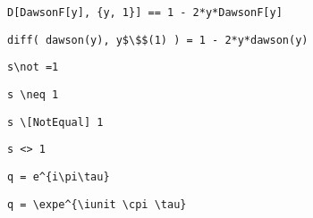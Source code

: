 \newsavebox\AXMM
\begin{lrbox}{\AXMM}
 \begin{minipage}[t]{0.82\textwidth}
  \lstinline[language={[latex]TeX},mathescape,breaklines=true]"D[DawsonF[y], {y, 1}] == 1 - 2*y*DawsonF[y]"
 \end{minipage}
\end{lrbox}
\newsavebox\AXMA
\begin{lrbox}{\AXMA}
 \begin{minipage}[t]{0.82\textwidth}
  \lstinline[language={[latex]TeX},mathescape,breaklines=true]"diff( dawson(y), y$\$$(1) ) = 1 - 2*y*dawson(y)"
 \end{minipage}
\end{lrbox}
\newsavebox\AYT
\begin{lrbox}{\AYT}
 \begin{minipage}[t]{0.82\textwidth}
  \lstinline[language={[latex]TeX},mathescape,breaklines=true]"s\not =1"
 \end{minipage}
\end{lrbox}
\newsavebox\AYST
\begin{lrbox}{\AYST}
 \begin{minipage}[t]{0.82\textwidth}
  \lstinline[language={[latex]TeX},mathescape,breaklines=true]"s \neq 1"
 \end{minipage}
\end{lrbox}
\newsavebox\AYMM
\begin{lrbox}{\AYMM}
 \begin{minipage}[t]{0.82\textwidth}
  \lstinline[language={[latex]TeX},mathescape,breaklines=true]"s \[NotEqual] 1"
 \end{minipage}
\end{lrbox}
\newsavebox\AYMA
\begin{lrbox}{\AYMA}
 \begin{minipage}[t]{0.82\textwidth}
  \lstinline[language={[latex]TeX},mathescape,breaklines=true]"s <> 1"
 \end{minipage}
\end{lrbox}
\newsavebox\AZT
\begin{lrbox}{\AZT}
 \begin{minipage}[t]{0.82\textwidth}
  \lstinline[language={[latex]TeX},mathescape,breaklines=true]"q = e^{i\pi\tau}"
 \end{minipage}
\end{lrbox}
\newsavebox\AZST
\begin{lrbox}{\AZST}
 \begin{minipage}[t]{0.82\textwidth}
  \lstinline[language={[latex]TeX},mathescape,breaklines=true]"q = \expe^{\iunit \cpi \tau}"
 \end{minipage}
\end{lrbox}
